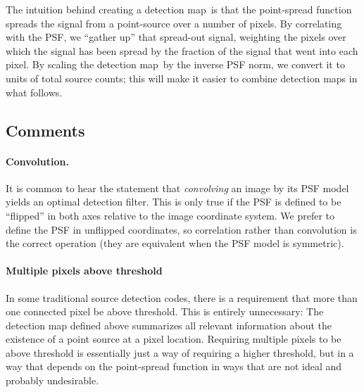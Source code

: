 \documentclass[letterpaper,preprint]{aastex}
\newcommand{\doctype}{paper}
\newcommand{\detmap}{detection map}
\newcommand{\snr}[1]{\mathbb{SN}(#1)}
\newcommand{\norm}[1]{\left\lVert #1 \right\rVert}
\renewcommand{\vec}[1]{\boldsymbol{#1}}
\newcommand{\kvec}{\vec{k}}
\begin{document}
The intuition behind creating a \detmap\ is that the point-spread
function spreads the signal from a point-source over a number of
pixels.  By correlating with the PSF, we ``gather up'' that spread-out
signal, weighting the pixels over which the signal has been spread by
the fraction of the signal that went into each pixel.  By scaling the
\detmap\ by the inverse PSF norm, we convert it to units of total
source counts; this will make it easier to combine \detmap s in what
follows.



\subsection{Comments}

\paragraph{Convolution.}  It is common to hear the statement
that \emph{convolving} an image by its PSF model yields an optimal
detection filter.  This is only true if the PSF is defined to be
``flipped'' in both axes relative to the image coordinate system.  We
prefer to define the PSF in unflipped coordinates, so correlation
rather than convolution is the correct operation (they are equivalent
when the PSF model is symmetric).





\paragraph{Multiple pixels above threshold}
In some traditional source detection codes, there is a requirement
that more than one connected pixel be above threshold.  This is
entirely unnecessary: The detection map defined above summarizes all
relevant information about the existence of a point source at a pixel
location.  Requiring multiple pixels to be above threshold is
essentially just a way of requiring a higher threshold, but in a way
that depends on the point-spread function in ways that are not ideal
and probably undesirable.
\end{document}
